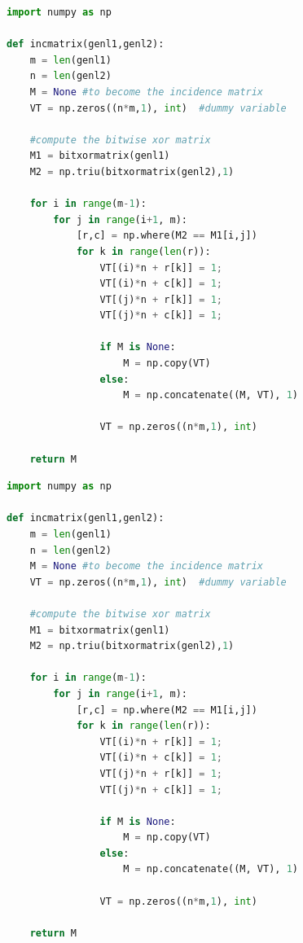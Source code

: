\documentclass[a4paper, 11pt]{article}
\begin{document}
\begin{lstlisting}[language=Python, caption=experimentación python]
import numpy as np
    
def incmatrix(genl1,genl2):
    m = len(genl1)
    n = len(genl2)
    M = None #to become the incidence matrix
    VT = np.zeros((n*m,1), int)  #dummy variable
    
    #compute the bitwise xor matrix
    M1 = bitxormatrix(genl1)
    M2 = np.triu(bitxormatrix(genl2),1) 

    for i in range(m-1):
        for j in range(i+1, m):
            [r,c] = np.where(M2 == M1[i,j])
            for k in range(len(r)):
                VT[(i)*n + r[k]] = 1;
                VT[(i)*n + c[k]] = 1;
                VT[(j)*n + r[k]] = 1;
                VT[(j)*n + c[k]] = 1;
                
                if M is None:
                    M = np.copy(VT)
                else:
                    M = np.concatenate((M, VT), 1)
                
                VT = np.zeros((n*m,1), int)
    
    return M
\end{lstlisting}

\begin{lstlisting}[language=Python, caption=Python example]
import numpy as np
    
def incmatrix(genl1,genl2):
    m = len(genl1)
    n = len(genl2)
    M = None #to become the incidence matrix
    VT = np.zeros((n*m,1), int)  #dummy variable
    
    #compute the bitwise xor matrix
    M1 = bitxormatrix(genl1)
    M2 = np.triu(bitxormatrix(genl2),1) 

    for i in range(m-1):
        for j in range(i+1, m):
            [r,c] = np.where(M2 == M1[i,j])
            for k in range(len(r)):
                VT[(i)*n + r[k]] = 1;
                VT[(i)*n + c[k]] = 1;
                VT[(j)*n + r[k]] = 1;
                VT[(j)*n + c[k]] = 1;
                
                if M is None:
                    M = np.copy(VT)
                else:
                    M = np.concatenate((M, VT), 1)
                
                VT = np.zeros((n*m,1), int)
    
    return M
\end{lstlisting}

\pagebreak


\end{document}
